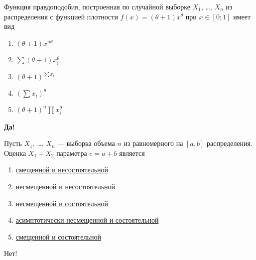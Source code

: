 \documentclass[t]{beamer}
\begin{document}
 \begin{frame} \label{40-Yes} 
\begin{block}{40} 

Функция правдоподобия, построенная по случайной выборке $X_1$, \ldots, $X_n$ из распределения с функцией плотности $f(x)=(\theta+1)x^{\theta}$ при $x\in [0;1]$ имеет вид
 


 \end{block} 
\begin{enumerate} 
\item[] \hyperlink{40-No}{\beamergotobutton{} $(\theta+1)x^{n\theta}$}
\item[] \hyperlink{40-No}{\beamergotobutton{} $\sum (\theta+1)x_i^{\theta}$}
\item[] \hyperlink{40-No}{\beamergotobutton{} $(\theta+1)^{\sum x_i}$}
\item[] \hyperlink{40-No}{\beamergotobutton{} $(\sum x_i)^{\theta}$}
\item[] \hyperlink{40-Yes}{\beamergotobutton{} $(\theta+1)^n\prod x_i^{\theta}$}
\end{enumerate} 

 \textbf{Да!} 
 \hyperlink{41}{}\end{frame} 


 \begin{frame} \label{1-No} 
\begin{block}{1} 

Пусть $X_1$, \ldots, $X_n$ — выборка объема $n$ из равномерного на $[a, b]$ распределения. Оценка $X_1+X_2$ параметра $c=a+b$ является
 


 \end{block} 
\begin{enumerate} 
\item[] \hyperlink{1-No}{\beamergotobutton{} смещенной и несостоятельной}
\item[] \hyperlink{1-Yes}{\beamergotobutton{} несмещенной и несостоятельной}
\item[] \hyperlink{1-No}{\beamergotobutton{} несмещенной и состоятельной}
\item[] \hyperlink{1-No}{\beamergotobutton{} асимптотически несмещенной и состоятельной}
\item[] \hyperlink{1-No}{\beamergotobutton{} смещенной и состоятельной}
\end{enumerate} 

 \alert{Нет!} 
\end{frame} 
\end{document}
